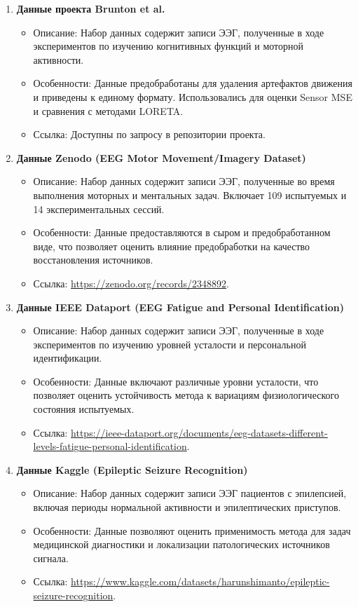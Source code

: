 \documentclass[sn-mathphys-num]{bst/sn-jnl}
\theoremstyle{thmstylethree}
\theoremstyle{thmstyletwo}
\theoremstyle{thmstyleone}
\begin{document}
\begin{enumerate}
    \item \textbf{Данные проекта Brunton et al.}
    \begin{itemize}
        \item Описание: Набор данных содержит записи ЭЭГ, полученные в ходе экспериментов по изучению когнитивных функций и моторной активности.
        \item Особенности: Данные предобработаны для удаления артефактов движения и приведены к единому формату. Использовались для оценки Sensor MSE и сравнения с методами LORETA.
        \item Ссылка: Доступны по запросу в репозитории проекта.
    \end{itemize}

    \item \textbf{Данные Zenodo (EEG Motor Movement/Imagery Dataset)}
    \begin{itemize}
        \item Описание: Набор данных содержит записи ЭЭГ, полученные во время выполнения моторных и ментальных задач. Включает 109 испытуемых и 14 экспериментальных сессий.
        \item Особенности: Данные предоставляются в сыром и предобработанном виде, что позволяет оценить влияние предобработки на качество восстановления источников.
        \item Ссылка: \url{https://zenodo.org/records/2348892}.
    \end{itemize}

    \item \textbf{Данные IEEE Dataport (EEG Fatigue and Personal Identification)}
    \begin{itemize}
        \item Описание: Набор данных содержит записи ЭЭГ, полученные в ходе экспериментов по изучению уровней усталости и персональной идентификации.
        \item Особенности: Данные включают различные уровни усталости, что позволяет оценить устойчивость метода к вариациям физиологического состояния испытуемых.
        \item Ссылка: \url{https://ieee-dataport.org/documents/eeg-datasets-different-levels-fatigue-personal-identification}.
    \end{itemize}

    \item \textbf{Данные Kaggle (Epileptic Seizure Recognition)}
    \begin{itemize}
        \item Описание: Набор данных содержит записи ЭЭГ пациентов с эпилепсией, включая периоды нормальной активности и эпилептических приступов.
        \item Особенности: Данные позволяют оценить применимость метода для задач медицинской диагностики и локализации патологических источников сигнала.
        \item Ссылка: \url{https://www.kaggle.com/datasets/harunshimanto/epileptic-seizure-recognition}.
    \end{itemize}


\end{enumerate}
\end{document}
